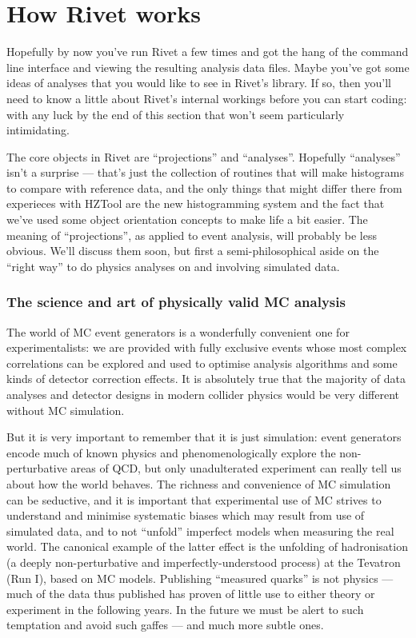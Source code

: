 \documentclass{JHEP3}
\begin{document}




\cleardoublepage
\part{How Rivet works}
\label{part:writinganalyses}

Hopefully by now you've run Rivet a few times and got the hang of the command
line interface and viewing the resulting analysis data files. Maybe you've got
some ideas of analyses that you would like to see in Rivet's library. If so,
then you'll need to know a little about Rivet's internal workings before you can
start coding: with any luck by the end of this section that won't seem
particularly intimidating.

The core objects in Rivet are ``projections'' and ``analyses''. Hopefully
``analyses'' isn't a surprise --- that's just the collection of routines that
will make histograms to compare with reference data, and the only things that
might differ there from experieces with HZTool are the new histogramming system
and the fact that we've used some object orientation concepts to make life a bit
easier. The meaning of ``projections'', as applied to event analysis, will
probably be less obvious. We'll discuss them soon, but first a
semi-philosophical aside on the ``right way'' to do physics analyses on and
involving simulated data.


\section{The science and art of physically valid MC analysis}

The world of MC event generators is a wonderfully convenient one for
experimentalists: we are provided with fully exclusive events whose most complex
correlations can be explored and used to optimise analysis algorithms and some
kinds of detector correction effects. It is absolutely true that the majority of
data analyses and detector designs in modern collider physics would be very
different without MC simulation.

But it is very important to remember that it is just simulation: event
generators encode much of known physics and phenomenologically explore the
non-perturbative areas of QCD, but only unadulterated experiment can really tell
us about how the world behaves. The richness and convenience of MC simulation
can be seductive, and it is important that experimental use of MC strives to
understand and minimise systematic biases which may result from use of simulated
data, and to not ``unfold'' imperfect models when measuring the real world. The
canonical example of the latter effect is the unfolding of hadronisation (a
deeply non-perturbative and imperfectly-understood process) at the Tevatron (Run
I), based on MC models. Publishing ``measured quarks'' is not physics --- much
of the data thus published has proven of little use to either theory or
experiment in the following years. In the future we must be alert to such
temptation and avoid such gaffes --- and much more subtle ones.
\end{document}
